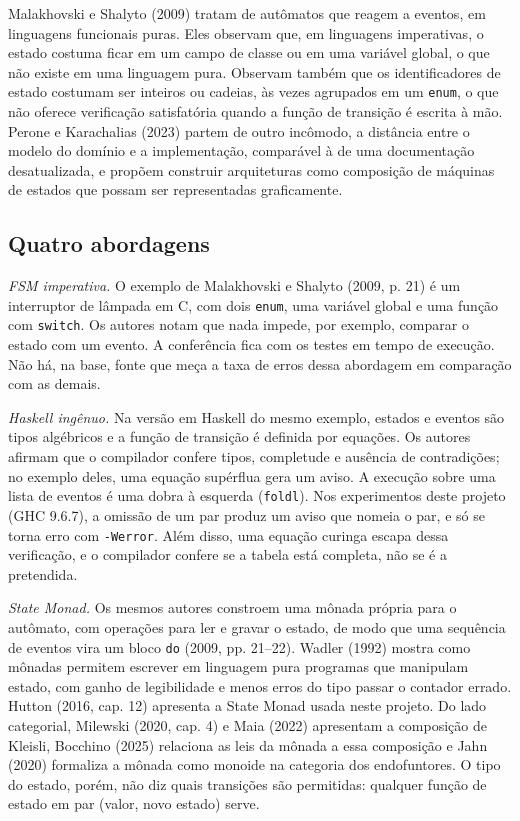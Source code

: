 \documentclass[12pt,a4paper]{article}
\begin{document}
Malakhovski e Shalyto (2009) tratam de autômatos que reagem a eventos, em linguagens funcionais puras. Eles observam que, em linguagens imperativas, o estado costuma ficar em um campo de classe ou em uma variável global, o que não existe em uma linguagem pura. Observam também que os identificadores de estado costumam ser inteiros ou cadeias, às vezes agrupados em um \texttt{enum}, o que não oferece verificação satisfatória quando a função de transição é escrita à mão. Perone e Karachalias (2023) partem de outro incômodo, a distância entre o modelo do domínio e a implementação, comparável à de uma documentação desatualizada, e propõem construir arquiteturas como composição de máquinas de estados que possam ser representadas graficamente.

\subsection{Quatro abordagens}

\textit{FSM imperativa.} O exemplo de Malakhovski e Shalyto (2009, p. 21) é um interruptor de lâmpada em C, com dois \texttt{enum}, uma variável global e uma função com \texttt{switch}. Os autores notam que nada impede, por exemplo, comparar o estado com um evento. A conferência fica com os testes em tempo de execução. Não há, na base, fonte que meça a taxa de erros dessa abordagem em comparação com as demais.

\textit{Haskell ingênuo.} Na versão em Haskell do mesmo exemplo, estados e eventos são tipos algébricos e a função de transição é definida por equações. Os autores afirmam que o compilador confere tipos, completude e ausência de contradições; no exemplo deles, uma equação supérflua gera um aviso. A execução sobre uma lista de eventos é uma dobra à esquerda (\texttt{foldl}). Nos experimentos deste projeto (GHC 9.6.7), a omissão de um par produz um aviso que nomeia o par, e só se torna erro com \texttt{-Werror}. Além disso, uma equação curinga escapa dessa verificação, e o compilador confere se a tabela está completa, não se é a pretendida.

\textit{State Monad.} Os mesmos autores constroem uma mônada própria para o autômato, com operações para ler e gravar o estado, de modo que uma sequência de eventos vira um bloco \texttt{do} (2009, pp. 21--22). Wadler (1992) mostra como mônadas permitem escrever em linguagem pura programas que manipulam estado, com ganho de legibilidade e menos erros do tipo passar o contador errado. Hutton (2016, cap. 12) apresenta a State Monad usada neste projeto. Do lado categorial, Milewski (2020, cap. 4) e Maia (2022) apresentam a composição de Kleisli, Bocchino (2025) relaciona as leis da mônada a essa composição e Jahn (2020) formaliza a mônada como monoide na categoria dos endofuntores. O tipo do estado, porém, não diz quais transições são permitidas: qualquer função de estado em par (valor, novo estado) serve.
\end{document}
